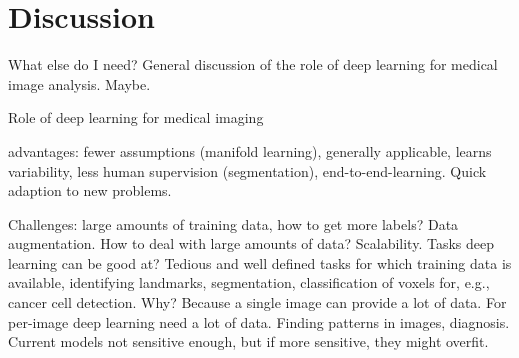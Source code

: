 \chapter{Discussion}

What else do I need? General discussion of the role of deep learning for medical
image analysis. Maybe.

Role of deep learning for medical imaging

advantages: fewer assumptions (manifold learning), generally applicable, learns
variability, less human supervision (segmentation), end-to-end-learning. Quick
adaption to new problems.

Challenges: large amounts of training data, how to get more labels? Data
augmentation. How to deal with large amounts of data? Scalability. Tasks deep
learning can be good at? Tedious and well defined tasks for which training data
is available, identifying landmarks, segmentation, classification of voxels for,
e.g., cancer cell detection. Why? Because a single image can provide a lot of
data. For per-image deep learning need a lot of data. Finding patterns in
images, diagnosis. Current models not sensitive enough, but if more sensitive,
they might overfit.
